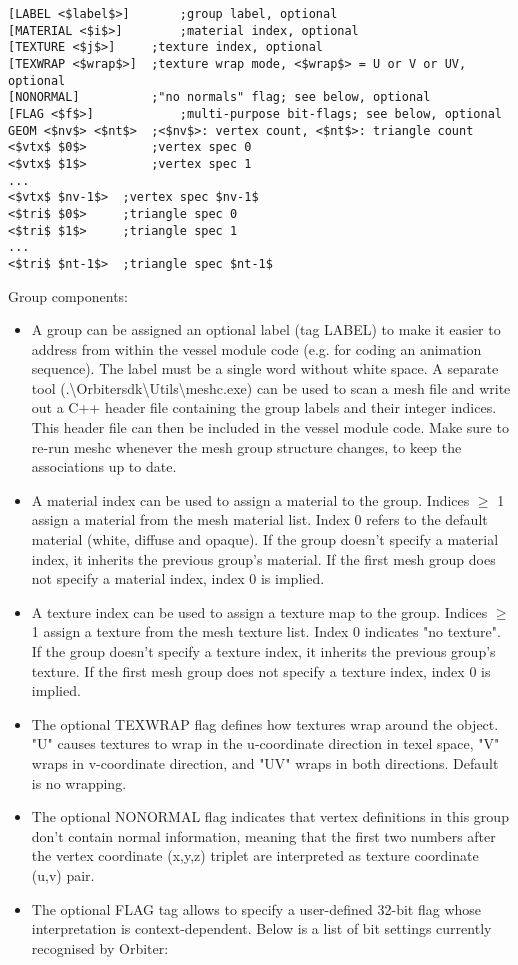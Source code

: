 \documentclass[Orbiter Developer Manual.tex]{subfiles}
\begin{document}
\begin{lstlisting}[language=OSFS,mathescape=true]
[LABEL <$label$>]		;group label, optional
[MATERIAL <$i$>]		;material index, optional
[TEXTURE <$j$>]		;texture index, optional
[TEXWRAP <$wrap$>]	;texture wrap mode, <$wrap$> = U or V or UV, optional
[NONORMAL]			;"no normals" flag; see below, optional
[FLAG <$f$>]			;multi-purpose bit-flags; see below, optional
GEOM <$nv$> <$nt$>	;<$nv$>: vertex count, <$nt$>: triangle count
<$vtx$ $0$>			;vertex spec 0
<$vtx$ $1$>			;vertex spec 1
...
<$vtx$ $nv-1$>	;vertex spec $nv-1$
<$tri$ $0$>		;triangle spec 0
<$tri$ $1$>		;triangle spec 1
...
<$tri$ $nt-1$>	;triangle spec $nt-1$
\end{lstlisting}

\noindent
Group components:

\begin{itemize}
\item A group can be assigned an optional label (tag LABEL) to make it easier to address from within the vessel module code (e.g. for coding an animation sequence). The label must be a single word without white space. A separate tool (.\textbackslash Orbitersdk\textbackslash Utils\textbackslash meshc.exe) can be used to scan a mesh file and write out a C++ header file containing the group labels and their integer indices. This header file can then be included in the vessel module code. Make sure to re-run meshc whenever the mesh group structure changes, to keep the associations up to date.
\item A material index can be used to assign a material to the group. Indices $\geq$ 1 assign a material from the mesh material list. Index 0 refers to the default material (white, diffuse and opaque). If the group doesn’t specify a material index, it inherits the previous group’s material. If the first mesh group does not specify a material index, index 0 is implied.
\item A texture index can be used to assign a texture map to the group. Indices $\geq$ 1 assign a texture from the mesh texture list. Index 0 indicates "no texture". If the group doesn’t specify a texture index, it inherits the previous group’s texture. If the first mesh group does not specify a texture index, index 0 is implied.
\item The optional TEXWRAP flag defines how textures wrap around the object. "U" causes textures to wrap in the u-coordinate direction in texel space, "V" wraps in v-coordinate direction, and "UV" wraps in both directions. Default is no wrapping.
\item The optional NONORMAL flag indicates that vertex definitions in this group don’t contain normal information, meaning that the first two numbers after the vertex coordinate (x,y,z) triplet are interpreted as texture coordinate (u,v) pair.
\item The optional FLAG tag allows to specify a user-defined 32-bit flag whose interpretation is context-dependent. Below is a list of bit settings currently recognised by Orbiter:


\end{itemize}
\end{document}
